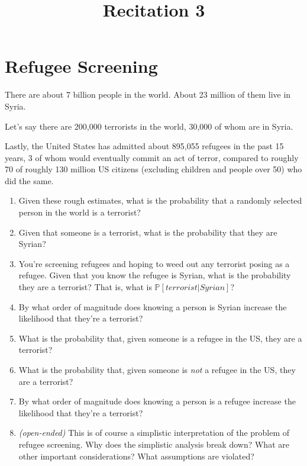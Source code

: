\documentclass{article}
\begin{document}
\title{Recitation 3}

\maketitle

\section{Refugee Screening}

There are about 7 billion people in the world. About 23 million of them live in Syria.

Let's say there are 200,000 terrorists in the world, 30,000 of whom are in Syria.

Lastly, the United States has admitted about 895,055 refugees in the past 15 years, 3 of whom would eventually commit an act of terror, compared to roughly 70 of roughly 130 million US citizens (excluding children and people over 50) who did the same.

\begin{enumerate}
\item Given these rough estimates, what is the probability that a randomly selected person in the world is a terrorist?
\item Given that someone is a terrorist, what is the probability that they are Syrian?
\item You're screening refugees and hoping to weed out any terrorist posing as a refugee. Given that you know the refugee is Syrian, what is the probability they are a terrorist? That is, what is $\mathbb{P}[terrorist|Syrian]$?
\item By what order of magnitude does knowing a person is Syrian increase the likelihood that they're a terrorist?
\item What is the probability that, given someone is a refugee in the US, they are a terrorist?
\item What is the probability that, given someone is \textit{not} a refugee in the US, they are a terrorist?
\item By what order of magnitude does knowing a person is a refugee increase the likelihood that they're a terrorist?
\item \textit{(open-ended)} This is of course a simplistic interpretation of the problem of refugee screening. Why does the simplistic analysis break down? What are other important considerations? What assumptions are violated?
\end{enumerate}
\end{document}
